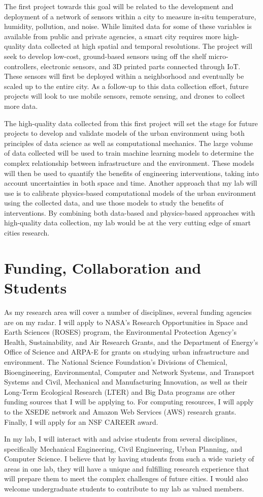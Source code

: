\documentclass[12pt]{article}
\begin{document}
The first project towards this goal will be related to the development and deployment of a network of sensors within a city to measure in-situ temperature, humidity, pollution, and noise. While limited data for some of these variables is available from public and private agencies, a smart city requires more high-quality data collected at high spatial and temporal resolutions. The project will seek to develop low-cost, ground-based sensors using off the shelf micro-controllers, electronic sensors, and 3D printed parts connected through IoT. These sensors will first be deployed within a neighborhood and eventually be scaled up to the entire city. As a follow-up to this data collection effort, future projects will look to use mobile sensors, remote sensing, and drones to collect more data.

The high-quality data collected from this first project will set the stage for future projects to develop and validate models of the urban environment using both principles of data science as well as computational mechanics. The large volume of data collected will be used to train machine learning models to determine the complex relationship between infrastructure and the environment. These models will then be used to quantify the benefits of engineering interventions, taking into account uncertainties in both space and time. Another approach that my lab will use is to calibrate physics-based computational models of the urban environment using the collected data, and use those models to study the benefits of interventions. By combining both data-based and physics-based approaches with high-quality data collection, my lab would be at the very cutting edge of smart cities research.

\section*{Funding, Collaboration and Students}
As my research area will cover a number of disciplines, several funding agencies are on my radar. I will apply to NASA's Research Opportunities in Space and Earth Sciences (ROSES) program, the Environmental Protection Agency's Health, Sustainability, and Air Research Grants, and the Department of Energy's Office of Science and ARPA-E for grants on studying urban infrastructure and environment. The National Science Foundation's Divisions of Chemical, Bioengineering, Environmental, Computer and Network Systems, and Transport Systems and Civil, Mechanical and Manufacturing Innovation, as well as their Long-Term Ecological Research (LTER) and Big Data programs are other funding sources that I will be applying to. For computing resources, I will apply to the XSEDE network and Amazon Web Services (AWS) research grants. Finally, I will apply for an NSF CAREER award.  

In my lab, I will interact with and advise students from several disciplines, specifically Mechanical Engineering, Civil Engineering, Urban Planning, and Computer Science. I believe that by having students from such a wide variety of areas in one lab, they will have a unique and fulfilling research experience that will prepare them to meet the complex challenges of future cities. I would also welcome undergraduate students to contribute to my lab as valued members.
\end{document}
